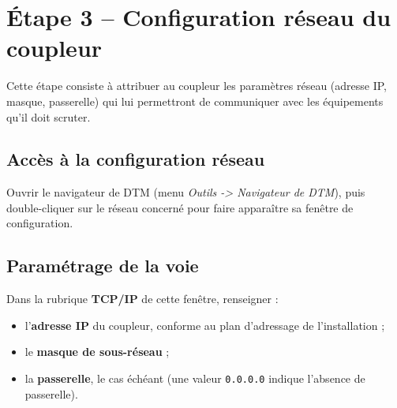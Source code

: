 \section{Étape 3 -- Configuration réseau du coupleur}
\label{secEtapeConfigReseau}

Cette étape consiste à attribuer au coupleur les paramètres réseau
(adresse IP, masque, passerelle) qui lui permettront de communiquer avec
les équipements qu'il doit scruter.

\subsection{Accès à la configuration réseau}

Ouvrir le navigateur de DTM (menu \emph{Outils -> Navigateur de DTM}), puis
double-cliquer sur le réseau concerné pour faire apparaître sa fenêtre de
configuration.

\subsection{Paramétrage de la voie}

Dans la rubrique \textbf{TCP/IP} de cette fenêtre, renseigner :

\begin{itemize}
    \item l'\textbf{adresse IP} du coupleur, conforme au plan d'adressage
    de l'installation ;
    \item le \textbf{masque de sous-réseau} ;
    \item la \textbf{passerelle}, le cas échéant (une valeur
    \texttt{0.0.0.0} indique l'absence de passerelle).
\end{itemize}



